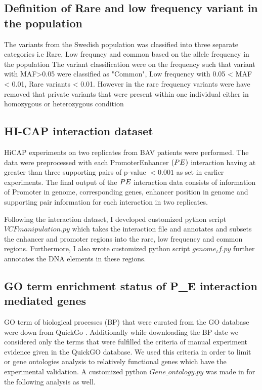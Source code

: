 \documentclass[11pt]{article} %
\begin{document}
\subsection{Definition of Rare and low frequency variant in the population}


The variants from the Swedish population was classified into three separate categories i.e Rare, Low frequncy and common based on the allele frequency  in the population The variant classification were on the frequency such that variant with MAF\textgreater{}0.05 were classified as "Common", Low frequency with 0.05 \textless{} MAF \textless{} 0.01, Rare variants \textless{} 0.01. However in the rare frequency variants were have removed that private variants that were present within one individual either in homozygous or heterozygous condition


\subsection{HI-CAP interaction dataset}

HiCAP experiments on two replicates from BAV patients were performed. The data were preprocessed with each Promoter\-Enhancer  $(P\-E)$ interaction having at greater than three supporting pairs of p-value $< 0.001$ as set in earlier experiments. The final output of the $P\-E$ interaction data consists of information of Promoter in genome, corresponding genes, enhancer position in genome and supporting pair information for each interaction in  two replicates. 

Following the interaction dataset, I developed customized python script $VCFmanipulation.py$  which takes the interaction file and annotates and subsets the enhancer and promoter regions into the rare, low frequency and common regions. Furthermore, I also wrote customized python script $genome_tf.py$ further annotates the DNA elements in these regions.


\subsection {GO term enrichment status of P\_E interaction mediated genes}

GO term of biological processes (BP) that were curated from the GO database were down from QuickGo \cite{quickgo} . Additionally while downloading  the  BP date we considered only the terms that were fulfilled the criteria of manual experiment evidence given in the QuickGO database. We used this criteria in order to limit or gene ontologies analysis to relatively functional genes which have the experimental validation. A customized python $Gene\_ontology.py$ was made in for the following analysis as well.
\end{document}
